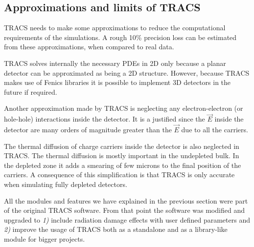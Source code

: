 \subsection{Approximations and limits of TRACS} %
\label{sec:approxTRACS}

TRACS needs to make some approximations to reduce the computational requirements of the simulations. A rough 10\% precision loss can be estimated from these approximations, when compared to real data. %
 
TRACS solves internally the necessary PDEs in 2D only because a planar detector can be approximated as being a 2D structure. However, because TRACS makes use of Fenics libraries it is possible to implement 3D detectors in the future if required.

Another approximation made by TRACS is neglecting any electron-electron (or hole-hole) interactions inside the detector. It is a justified since the $\overrightarrow E$ inside the detector are many orders of magnitude greater than the $\overrightarrow E$ due to all the carriers.

The thermal diffusion of charge carriers inside the detector is also neglected in TRACS. The thermal diffusion is mostly important in the undepleted bulk. In the depleted zone it adds a smearing of few microns to the final position of the carriers. A consequence of this simplification is that TRACS is only accurate when simulating fully depleted detectors. 

\label{sec:devTRACS}

All the modules and features we have explained in the previous section were part of the original TRACS software. From that point the software was modified and upgraded to \emph{1)} include radiation damage effects  with user defined parameters and \emph{2)} improve the usage of TRACS both as a standalone and as a library-like module for bigger projects.


